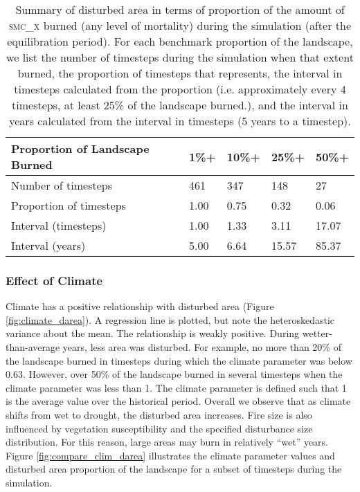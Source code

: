 \begin{table}[!htbp]
\centering
\caption{Summary of disturbed area in terms of proportion of the amount of \textsc{smc\_x} burned (any level of mortality) during the simulation (after the equilibration period). For each benchmark proportion of the landscape, we list the number of timesteps during the simulation when that extent burned, the proportion of timesteps that represents, the interval in timesteps calculated from the proportion (i.e. approximately every 4 timesteps, at least 25\% of the landscape burned.), and the interval in years calculated from the interval in timesteps (5 years to a timestep).}
\label{tab:darea_atleast_smcx}
\begin{tabular}{@{}lllll@{}}
\textbf{Proportion of Landscape Burned} & \textbf{1\%+}     & \textbf{10\%+}    & \textbf{25\%+}    & \textbf{50\%+} \\ \midrule
Number of timesteps     & 461          & 347           & 148           & 27            \\
Proportion of timesteps & 1.00         & 0.75          & 0.32          & 0.06          \\
Interval (timesteps)    & 1.00         & 1.33          & 3.11          & 17.07         \\
Interval (years)        & 5.00         & 6.64          & 15.57         & 85.37         \\ \bottomrule
\end{tabular}
\end{table}



\subsubsection{Effect of Climate} 
Climate has a positive relationship with disturbed area (Figure \ref{fig:climate_darea}). A regression line is plotted, but note the heteroskedastic variance about the mean. The relationship is weakly positive. During wetter-than-average years, less area was disturbed. For example, no more than 20\% of the landscape burned in timesteps during which the climate parameter was below 0.63. However, over 50\% of the landscape burned in several timesteps when the climate parameter was less than 1. The climate parameter is defined such that 1 is the average value over the historical period. Overall we observe that as climate shifts from wet to drought, the disturbed area increases. Fire size is also influenced by vegetation susceptibility and the specified disturbance size distribution. For this reason, large areas may burn in relatively ``wet'' years. Figure \ref{fig:compare_clim_darea} illustrates the climate parameter values and disturbed area proportion of the landscape for a subset of timesteps during the simulation.

